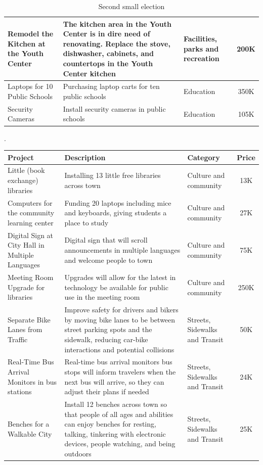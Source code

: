 \documentclass[10pt]{article}
\begin{document}
\begin{appendices}
\begin{table}[ht!]
\begin{center}
\begin{tabular}{|p{4cm}|p{8cm}|p{3cm}|c|}
    \hline
    Remodel the Kitchen at the Youth Center & The kitchen area in the Youth Center is in dire need of renovating. Replace the stove, dishwasher, cabinets, and countertops in the Youth Center kitchen & Facilities, parks and recreation & 200K\\
    \hline
    Laptops for 10 Public Schools & Purchasing laptop carts for ten public schools & Education & 350K\\
    \hline
    Security Cameras & Install security cameras in public schools & Education & 105K\\
     \hline
    \end{tabular}
  \caption{Second small election}\label{tab:second_elc}.
  \end{center}
\end{table}

\begin{longtable}[ht!]{|p{4cm}|p{8cm}|p{3cm}|c|}
    \hline
    \textbf{Project} & \textbf{Description} & \textbf{Category} & \textbf{Price}\\
    \hline
    Little (book exchange) libraries &  Installing 13 little free libraries across town & Culture and community & 13K\\
    \hline
    Computers for the community learning center & Funding 20 laptops including mice and keyboards, giving students a place to study & Culture and community &  27K\\
    \hline
    Digital Sign at City Hall in Multiple Languages & Digital sign that will scroll announcements in multiple languages and welcome people to town & Culture and community & 75K\\
    \hline
    Meeting Room Upgrade for libraries & Upgrades will allow for the latest in technology be available for public use in the meeting room & Culture and community &  250K\\
    \hline
    Separate Bike Lanes from Traffic & Improve safety for drivers and bikers by moving bike lanes to be between street parking spots and the sidewalk, reducing car-bike interactions and potential collisions & Streets, Sidewalks and Transit & 50K\\
    \hline
    Real-Time Bus Arrival Monitors in bus stations & Real-time bus arrival monitors bus stops will inform travelers when the next bus will arrive, so they can adjust their plans if needed &  Streets, Sidewalks and Transit &  24K\\
    \hline
    Benches for a Walkable City & Install 12 benches across town so that people of all ages and abilities can enjoy benches for resting, talking, tinkering with electronic devices, people watching, and being outdoors & Streets, Sidewalks and Transit & 25K\\

\end{longtable}
\end{appendices}
\end{document}
